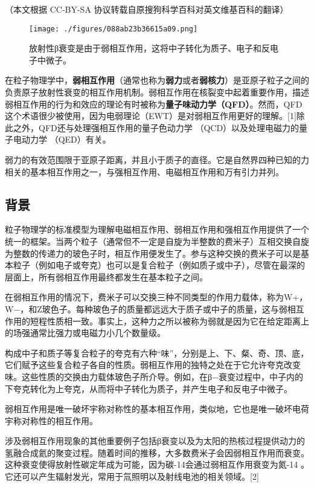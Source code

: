 
（本文根据 CC-BY-SA 协议转载自原搜狗科学百科对英文维基百科的翻译）

\begin{figure}[ht]
\centering
\texttt{[image: ./figures/088ab23b36615a09.png]}
\caption{放射性β衰变是由于弱相互作用，这将中子转化为质子、电子和反电子中微子。} \label{fig_RXHZY_1}
\end{figure}
在粒子物理学中，\textbf{弱相互作用}（通常也称为\textbf{弱力}或者\textbf{弱核力}）是亚原子粒子之间的负责原子放射性衰变的相互作用机制。弱相互作用在核裂变中起着重要作用，描述弱相互作用的行为和效应的理论有时被称为\textbf{量子味动力学（QFD）}。然而，QFD这个术语很少被使用，因为电弱理论（EWT）是对弱相互作用更好的理解。[1]除此之外，QFD还与处理强相互作用的量子色动力学 （QCD）以及处理电磁力的量子电动力学 （QED）有关。

弱力的有效范围限于亚原子距离，并且小于质子的直径。它是自然界四种已知的力相关的基本相互作用之一，与强相互作用、电磁相互作用和万有引力并列。

\subsection{背景}
粒子物理学的标准模型为理解电磁相互作用、弱相互作用和强相互作用提供了一个统一的框架。当两个粒子（通常但不一定是自旋为半整数的费米子）互相交换自旋为整数的传递力的玻色子时，相互作用便发生了。参与这种交换的费米子可以是基本粒子（例如电子或夸克）也可以是复合粒子（例如质子或中子），尽管在最深的层面上，所有弱相互作用最终都发生在基本粒子之间。

在弱相互作用的情况下，费米子可以交换三种不同类型的作用力载体，称为W+，W−，和Z玻色子。每种玻色子的质量都远远大于质子或中子的质量，这与弱相互作用的短程性质相一致。事实上，这种力之所以被称为弱就是因为它在给定距离上的场强通常比强力或电磁力小几个数量级。

构成中子和质子等复合粒子的夸克有六种“味”，分别是上、下、粲、奇、顶、底，它们赋予这些复合粒子各自的性质。弱相互作用的独特之处在于它允许夸克改变味。这些性质的交换由力载体玻色子所介导。例如，在β−衰变过程中，中子内的下夸克转化为上夸克，从而将中子转化为质子，并产生电子和反电子中微子。

弱相互作用是唯一破坏宇称对称性的基本相互作用，类似地，它也是唯一破坏电荷宇称对称性的相互作用。

涉及弱相互作用现象的其他重要例子包括β衰变以及为太阳的热核过程提供动力的氢融合成氦的聚变过程。随着时间的推移，大多数费米子会因弱相互作用而衰变。这种衰变使得放射性碳定年成为可能，因为碳-14会通过弱相互作用衰变为氮-14 。它还可以产生辐射发光，常用于氚照明以及射线电池的相关领域。[2]

